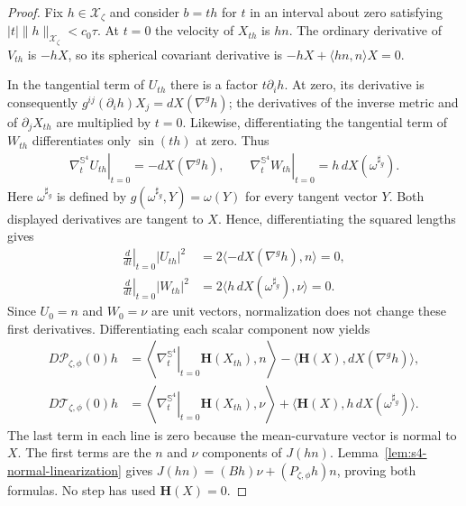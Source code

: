 \documentclass[a4paper,11pt,oneside,reqno]{amsart}
\numberwithin{equation}{section}
\theoremstyle{definition}
\begin{document}
\begin{proof}
    Fix $h\in\mathcal X_\zeta$ and consider $b=th$ for
    $t$ in an interval about zero satisfying
    $|t|\|h\|_{\mathcal X_\zeta}<c_0\tau$. At $t=0$
    the velocity of $X_{th}$ is $hn$. The ordinary derivative
    of $V_{th}$ is $-hX$, so its spherical covariant
    derivative is $-hX+\langle hn,n\rangle X=0$.

    In the tangential term of $U_{th}$ there is a factor
    $t\partial_i h$. At zero, its derivative is consequently
    $g^{ij}(\partial_i h)X_j=dX(\nabla^g h)$; the derivatives
    of the inverse metric and of $\partial_jX_{th}$ are
    multiplied by $t=0$. Likewise, differentiating the
    tangential term of $W_{th}$ differentiates only
    $\sin(th)$ at zero. Thus
    \begin{align*}
        \left.\nabla^{\mathbb{S}^4}_t U_{th}\right|_{t=0}
        =-dX(\nabla^g h),
        \qquad
        \left.\nabla^{\mathbb{S}^4}_t W_{th}\right|_{t=0}
        =h\,dX(\omega^{\sharp_g}).
    \end{align*}
    Here $\omega^{\sharp_g}$ is defined by
    $g(\omega^{\sharp_g},Y)=\omega(Y)$ for every tangent
    vector $Y$. Both displayed derivatives are tangent to
    $X$. Hence, differentiating the squared lengths gives
    \begin{align*}
        \left.\frac{d}{dt}\right|_{t=0}|U_{th}|^2
        &=2\langle-dX(\nabla^g h),n\rangle=0,\\
        \left.\frac{d}{dt}\right|_{t=0}|W_{th}|^2
        &=2\langle h\,dX(\omega^{\sharp_g}),\nu\rangle=0.
    \end{align*}
    Since $U_0=n$ and $W_0=\nu$ are unit vectors, normalization
    does not change these first derivatives. Differentiating
    each scalar component now yields
    \begin{align*}
        D\mathscr P_{\zeta,\phi}(0)h
        &=\left\langle
        \left.\nabla_t^{\mathbb S^4}\right|_{t=0}
        \mathbf H(X_{th}),n\right\rangle
        -\langle\mathbf H(X),dX(\nabla^g h)\rangle,\\
        D\mathscr T_{\zeta,\phi}(0)h
        &=\left\langle
        \left.\nabla_t^{\mathbb S^4}\right|_{t=0}
        \mathbf H(X_{th}),\nu\right\rangle
        +\langle\mathbf H(X),h\,dX(\omega^{\sharp_g})\rangle.
    \end{align*}
    The last term in each line is zero because the
    mean-curvature vector is normal to $X$. The first terms
    are the $n$ and $\nu$ components of $J(hn)$.
    Lemma~\ref{lem:s4-normal-linearization} gives
    $J(hn)=(Bh)\nu+(P_{\zeta,\phi}h)n$, proving both formulas.
    No step has used $\mathbf H(X)=0$.
\end{proof}
\end{document}
